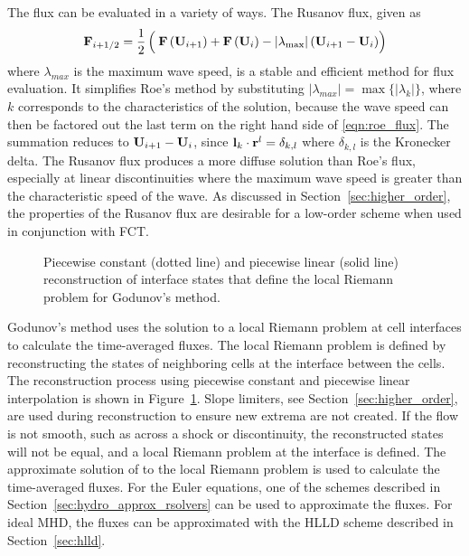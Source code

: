 The flux can be evaluated in a variety of ways.  The Rusanov flux, given as
\begin{gather}
\label{eqn:rusanov}
\mbf{F}_{i+1/2} = \half\left(\phantom{\frac{}{}}\mbf{F}\left(\mbf{U}_{i+1}\right) + \mbf{F}\left(\mbf{U}_{i}\right)
            - |\lambda_{\max}|\left(\mbf{U}_{i+1} - \mbf{U}_{i} \right) \right)
\end{gather}
where $\lambda_{max}$ is the maximum wave speed, is a stable and efficient method for flux evaluation.  It simplifies Roe's method by substituting $|\lambda_{max}| = \max\{|\lambda_k|\}$, where $k$ corresponds to the characteristics of the solution, because the wave speed can then be factored out the last term on the right hand side of \eqref{eqn:roe_flux}.  The summation reduces to $\mathbf{U}_{i+1} - \mathbf{U}_{i}$, since $\mathbf{l}_k\cdot\mathbf{r}^l = \delta_{k,l}$ where $\delta_{k,l}$ is the Kronecker delta.  The Rusanov flux produces a more diffuse solution than Roe's flux, especially at linear discontinuities where the maximum wave speed is greater than the characteristic speed of the wave.  As discussed in Section~\ref{sec:higher_order}, the properties of the Rusanov flux are desirable for a low-order scheme when used in conjunction with FCT.  

\begin{figure}[htbp]
\begin{center}

\end{center}
\caption{Piecewise constant (dotted line) and piecewise linear (solid line) reconstruction of interface states that define the local Riemann problem for Godunov's method.}
\label{fig:interface}
\end{figure}

Godunov's method uses the solution to a local Riemann problem at cell interfaces to calculate the time-averaged fluxes.  The local Riemann problem is defined by reconstructing the states of neighboring cells at the interface between the cells.  The reconstruction process using piecewise constant and piecewise linear interpolation is shown in Figure~\ref{fig:interface}.  Slope limiters, see Section~\ref{sec:higher_order}, are used during reconstruction to ensure new extrema are not created.  If the flow is not smooth, such as across a shock or discontinuity, the reconstructed states will not be equal, and a local Riemann problem at the interface is defined.  The approximate solution of to the local Riemann problem is used to calculate the time-averaged fluxes.  For the Euler equations, one of the schemes described in Section~\ref{sec:hydro_approx_rsolvers} can be used to approximate the fluxes.  For ideal MHD, the fluxes can be approximated with the HLLD scheme described in Section~\ref{sec:hlld}.  

